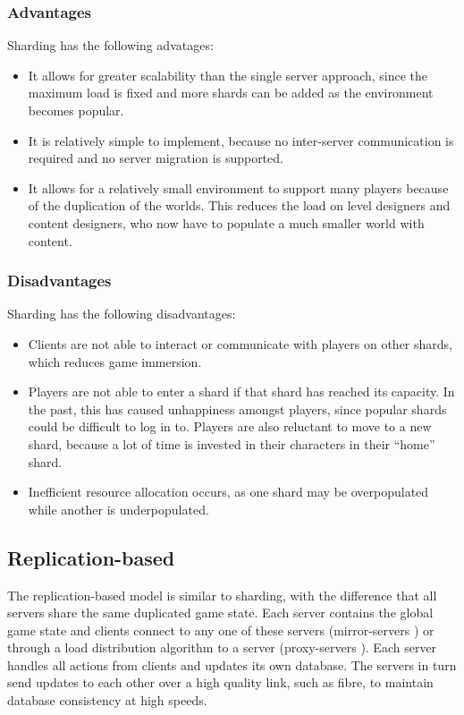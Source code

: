 \subsubsection{Advantages}

Sharding has the following advatages:
\begin{itemize}

\item It allows for greater scalability than the single server approach, since the maximum load is fixed and more shards can be added as the environment becomes popular.

\item It is relatively simple to implement, because no inter-server communication is required and no server migration is supported.

\item It allows for a relatively small environment to support many players because of the duplication of the worlds. This reduces the load on level designers and content designers, who now have to populate a much smaller world with content.
\end{itemize}

\subsubsection{Disadvantages}

Sharding has the following disadvantages:
\begin{itemize}
\item Clients are not able to interact or communicate with players on other shards, which reduces game immersion.

\item Players are not able to enter a shard if that shard has reached its capacity. In the past, this has caused unhappiness amongst players, since popular shards could be difficult to log in to. Players are also reluctant to move to a new shard, because a lot of time is invested in their characters in their ``home'' shard.

\item Inefficient resource allocation occurs, as one shard may be overpopulated while another is underpopulated.
\end{itemize}

\subsection{Replication-based}
The replication-based model is similar to sharding, with the difference that all servers share the same duplicated game state. Each server contains the global game state and clients connect to any one of these servers (mirror-servers \cite{mirrored_server}) or through a load distribution algorithm to a server (proxy-servers \cite{proxy_server_dist}).
Each server handles all actions from clients and updates its own database. The servers in turn send updates to each other over a high quality link, such as fibre, to maintain database consistency at high speeds.

